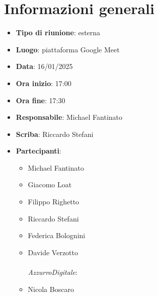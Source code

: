 


\section{Informazioni generali}

\begin{itemize}
    \item \textbf{Tipo di riunione}: esterna
    \item \textbf{Luogo}: piattaforma Google Meet
    \item \textbf{Data}: 16/01/2025
    \item \textbf{Ora inizio}: 17:00
    \item \textbf{Ora fine}: 17:30
    \item \textbf{Responsabile}: Michael Fantinato
    \item \textbf{Scriba}: Riccardo Stefani
    \item \textbf{Partecipanti}:
    \begin{itemize}
        \item Michael Fantinato
        \item Giacomo Loat
        \item Filippo Righetto
        \item Riccardo Stefani
        \item Federica Bolognini
        \item Davide Verzotto \\ \\
        \emph{AzzurroDigitale}:
        \item Nicola Boscaro
    \end{itemize}
\end{itemize}
